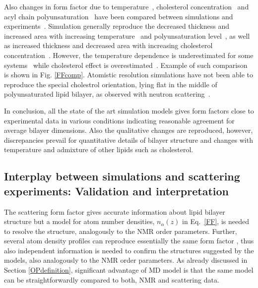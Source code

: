 \documentclass[aps,prl,superscriptaddress,twocolumn]{revtex4}
\begin{document}
Also changes in form factor due to temperature~\cite{jambeck12,zhuang14}, cholesterol concentration~\cite{jambeck13,madej15} 
and acyl chain polyunsaturation~\cite{eldho03,klauda12} have been compared between simulations and 
experiments~\cite{eldho03,kucerka05a,pan08,hodzic08,kucerka08,pan09,khelasvili10,kucerka11}.
Simulation generally reproduce the decreased thickness and increased area with increasing temperature~\cite{jambeck12,zhuang14} and 
polyunsaturation level~\cite{eldho03,klauda12}, 
as well as increased thickness and decreased area with increasing cholesterol concentration~\cite{jambeck13,madej15}.
However, the temperature dependence is underestimated for some systems~\cite{jambeck12,zhuang14} while cholesterol
effect is overestimated~\cite{jambeck13,madej15}. Example of such comparison is shown in Fig. \ref{FFcomp}.
Atomistic resolution simulations have not been able to reproduce the special cholestrol orientation, lying flat in
the middle of polyunsaturated lipid bilayer, as observed with neutron scattering~\cite{harroun08,marrink07,kucerka10b}.

In conclusion, all the state of the art simulation models gives form factors close to experimental
data in various conditions indicating reasonable agreement for average bilayer dimensions. Also the qualitative changes are reproduced, however, 
discrepancies prevail for quantitative details of bilayer structure and changes with temperature and admixture of other lipids such as cholesterol.


\subsection{Interplay between simulations and scattering experiments: Validation and interpretation}
The scattering form factor gives accurate information about lipid
bilayer structure but a model for atom number densities, $n_\alpha(z)$ in Eq.~\ref{FF}, is needed to 
resolve the structure, analogously to the NMR order parameters. Further, several atom density
profiles can reproduce essentially the same form factor \cite{kucerka08a}, thus also independent information is needed to 
confirm the structures suggested by the models, also analogously to the NMR order parameters. 
As already discussed in Section \ref{OPdefinition}, significant advantage of MD model is that the same model 
can be straightforwardly compared to both, NMR and scattering data.
\end{document}
